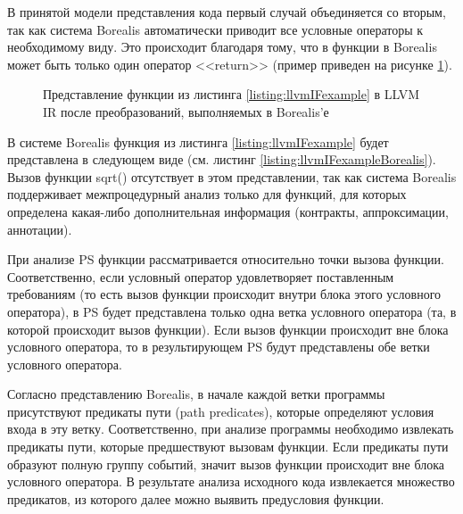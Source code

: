 В принятой модели представления кода первый случай объединяется со вторым, так как система Borealis автоматически приводит все условные операторы к необходимому виду. Это происходит благодаря тому, что в функции в Borealis может быть только один оператор <<return>> (пример приведен на рисунке \ref{image:llvmIFcfg}).

 	
\begin{figure}[h!]
\caption{Представление функции из листинга \ref{listing:llvmIFexample} в LLVM IR после преобразований, выполняемых в Borealis'е}
\label{image:llvmIFcfg}
\end{figure}

В системе Borealis функция из листинга \ref{listing:llvmIFexample} будет представлена в следующем виде (см. листинг \ref{listing:llvmIFexampleBorealis}). Вызов функции sqrt() отсутствует в этом представлении, так как система Borealis поддерживает межпроцедурный анализ только для функций, для которых определена какая-либо дополнительная информация (контракты, аппроксимации, аннотации).


При анализе PS функции рассматривается относительно точки вызова функции. Соответственно, если условный оператор удовлетворяет поставленным требованиям (то есть вызов функции происходит внутри блока этого условного оператора), в PS будет представлена только одна ветка условного оператора (та, в которой происходит вызов функции). Если вызов функции происходит вне блока условного оператора, то в результирующем PS будут представлены обе ветки условного оператора.

Согласно представлению Borealis, в начале каждой ветки программы присутствуют предикаты пути (path predicates), которые определяют условия входа в эту ветку. Соответственно, при анализе программы необходимо извлекать предикаты пути, которые предшествуют вызовам функции. Если предикаты пути образуют полную группу событий, значит вызов функции происходит вне блока условного оператора. В результате анализа исходного кода извлекается множество предикатов, из которого далее можно выявить предусловия функции.

